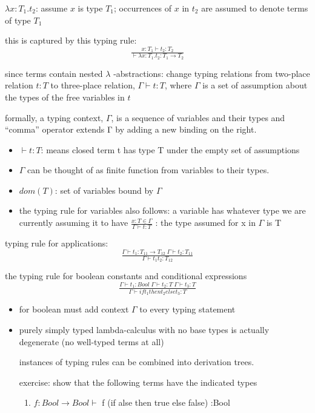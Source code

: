 \documentclass[11pt]{article}
\begin{document}
\(\lambda x:T_1. t_2\): assume \(x\) is type \(T_1\); occurrences of \(x\) in \(t_2\) are assumed to denote terms of type \(T_1\)

this is captured by this typing rule:
\begin{equation}
\tfrac{x:T_1 \vdash t_2 : T_2}{\vdash \lambda x:T_1.t_2 : T_1 \rightarrow T_2 }
\end{equation}

since terms contain nested \(\lambda\) -abstractions: change typing relations from two-place relation \(t : T\) to three-place relation, \(\Gamma \vdash t : T\), where \(\Gamma\) is a set of assumption about the types of the free variables in \(t\)

formally, a typing context, \(\Gamma\), is a sequence of variables and their types and ``comma'' operator extends Γ by adding a new binding on the right.

\begin{itemize}
\item \(\vdash t : T\): means closed term t has type T under the empty set of assumptions
\item \(\Gamma\) can be thought of as finite function from variables to their types.
\item \(dom(T)\): set of variables bound by \(\Gamma\)
\item the typing rule for variables also follows: a variable has whatever type we are currently assuming it to have
\(\tfrac{x:T \in \Gamma}{\Gamma ⊢ t : T}\) : the type assumed for x in \(\Gamma\) is T
\end{itemize}

typing rule for applications:
\begin{equation}
\tfrac{\Gamma \vdash t_1 : T_{11} \rightarrow T_{12} \; \Gamma \vdash t_2 : T_11}{\Gamma \vdash t_1 t_2 : T_12}
\end{equation}


the typing rule for boolean constants and conditional expressions
\begin{equation}
\tfrac{\Gamma \vdash t_1 : Bool \; \Gamma \vdash t_2 : T \; \Gamma \vdash t_3 : T}{\Gamma \vdash if t_1 then t_2 else t_3 : T}
\end{equation}

\begin{itemize}
\item for boolean must add context \(\Gamma\) to every typing statement

\item purely simply typed lambda-calculus with no base types is actually degenerate (no well-typed terms at all)

instances of typing rules can be combined into derivation trees.

exercise: show that the following terms have the indicated types
\begin{enumerate}
\item \(f: Bool \rightarrow Bool \vdash\) f (if alse then true else false) :Bool
\end{enumerate}
\end{itemize}
\end{document}
